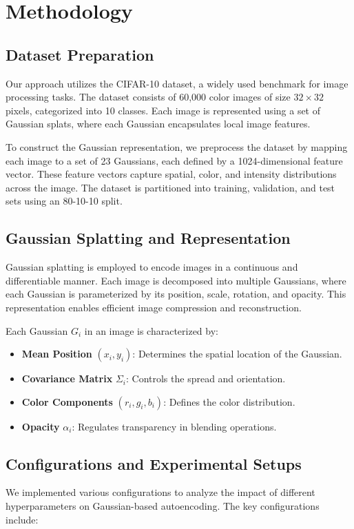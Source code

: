 \section{Methodology}
\label{sec:methodology}

\subsection{Dataset Preparation}
Our approach utilizes the CIFAR-10 dataset, a widely used benchmark for image processing tasks. The dataset consists of 60,000 color images of size $32 \times 32$ pixels, categorized into 10 classes. Each image is represented using a set of Gaussian splats, where each Gaussian encapsulates local image features. 

To construct the Gaussian representation, we preprocess the dataset by mapping each image to a set of 23 Gaussians, each defined by a 1024-dimensional feature vector. These feature vectors capture spatial, color, and intensity distributions across the image. The dataset is partitioned into training, validation, and test sets using an 80-10-10 split.

\subsection{Gaussian Splatting and Representation}
Gaussian splatting is employed to encode images in a continuous and differentiable manner. Each image is decomposed into multiple Gaussians, where each Gaussian is parameterized by its position, scale, rotation, and opacity. This representation enables efficient image compression and reconstruction.

Each Gaussian $G_i$ in an image is characterized by:
\begin{itemize}
    \item \textbf{Mean Position} $(x_i, y_i)$: Determines the spatial location of the Gaussian.
    \item \textbf{Covariance Matrix} $\Sigma_i$: Controls the spread and orientation.
    \item \textbf{Color Components} $(r_i, g_i, b_i)$: Defines the color distribution.
    \item \textbf{Opacity} $\alpha_i$: Regulates transparency in blending operations.
\end{itemize}

\subsection{Configurations and Experimental Setups}
We implemented various configurations to analyze the impact of different hyperparameters on Gaussian-based autoencoding. The key configurations include:

